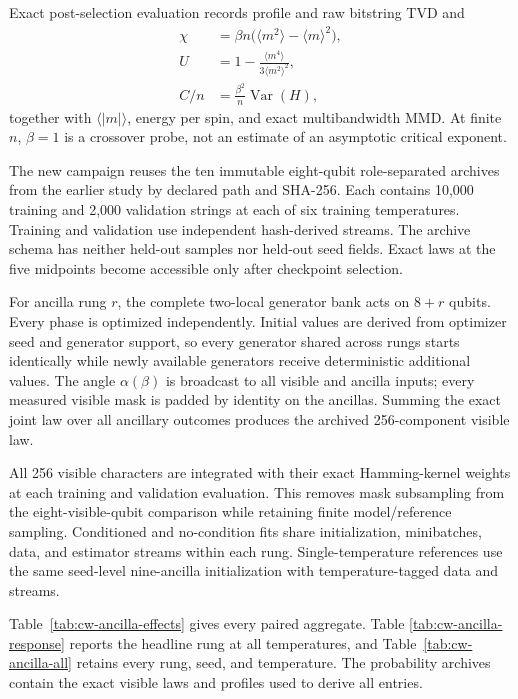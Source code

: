 Exact post-selection evaluation records profile and raw bitstring TVD and
\begin{align}
 \chi &= \beta n\bigl(\langle m^2\rangle-\langle m\rangle^2\bigr),\\
 U &= 1-\frac{\langle m^4\rangle}{3\langle m^2\rangle^2},\\
 C/n &= \frac{\beta^2}{n}\operatorname{Var}(H),
\end{align}
together with $\langle|m|\rangle$, energy per spin, and exact multibandwidth
MMD.  At finite $n$, $\beta=1$ is a crossover probe, not an estimate of an
asymptotic critical exponent.

The new campaign reuses the ten immutable eight-qubit role-separated archives
from the earlier study by declared path and SHA-256.  Each contains 10,000
training and 2,000 validation strings at each of six training temperatures.
Training and validation use independent hash-derived streams.  The archive
schema has neither held-out samples nor held-out seed fields.  Exact laws at
the five midpoints become accessible only after checkpoint selection.

For ancilla rung $r$, the complete two-local generator bank acts on $8+r$
qubits.  Every phase is optimized independently.  Initial values are derived
from optimizer seed and generator support, so every generator shared across
rungs starts identically while newly available generators receive deterministic
additional values.  The angle $\alpha(\beta)$ is broadcast to all visible and
ancilla inputs; every measured visible mask is padded by identity on the
ancillas.  Summing the exact joint law over all ancillary outcomes produces the
archived 256-component visible law.

All 256 visible characters are integrated with their exact Hamming-kernel
weights at each training and validation evaluation.  This removes mask
subsampling from the eight-visible-qubit comparison while retaining finite
model/reference sampling.  Conditioned and no-condition fits share
initialization, minibatches, data, and estimator streams within each rung.
Single-temperature references use the same seed-level nine-ancilla
initialization with temperature-tagged data and streams.

\ifcurieweissancillaresults
Table~\ref{tab:cw-ancilla-effects} gives every paired aggregate.  Table
\ref{tab:cw-ancilla-response} reports the headline rung at all temperatures,
and Table~\ref{tab:cw-ancilla-all} retains every rung, seed, and temperature.
The probability archives contain the exact visible laws and profiles used to
derive all entries.

